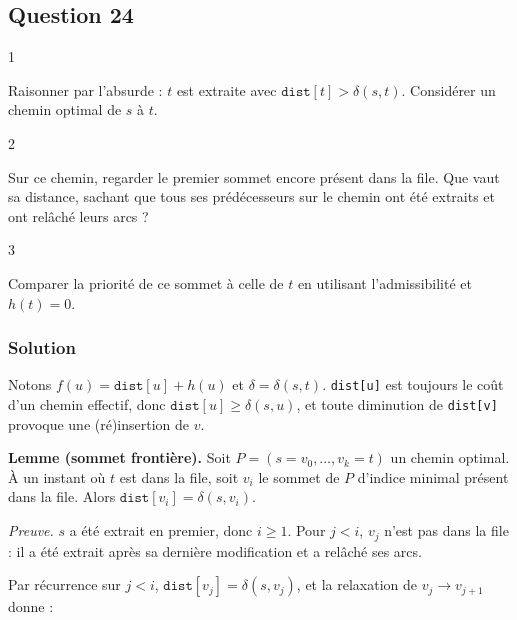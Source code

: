 \documentclass[11pt,a4paper]{article}
\begin{document}
\hypertarget{question-24}{%
\subsection{Question 24}\label{question-24}}

\begin{indication}{1}

Raisonner par l'absurde : \(t\) est extraite avec \(\texttt{dist}[t] > \delta(s,t)\). Considérer un chemin optimal de \(s\) à \(t\).

\end{indication}

\begin{indication}{2}

Sur ce chemin, regarder le premier sommet encore présent dans la file. Que vaut sa distance, sachant que tous ses prédécesseurs sur le chemin ont été extraits et ont relâché leurs arcs ?

\end{indication}

\begin{indication}{3}

Comparer la priorité de ce sommet à celle de \(t\) en utilisant l'admissibilité et \(h(t) = 0\).

\end{indication}

\hypertarget{solution-23}{%
\subsubsection{Solution}\label{solution-23}}

Notons \(f(u) = \texttt{dist}[u] + h(u)\) et \(\delta = \delta(s,t)\). \texttt{dist{[}u{]}} est toujours le coût d'un chemin effectif, donc \(\texttt{dist}[u] \ge \delta(s,u)\), et toute diminution de \texttt{dist{[}v{]}} provoque une (ré)insertion de \(v\).

\textbf{Lemme (sommet frontière).} Soit \(P = (s = v_0, \dots, v_k = t)\) un chemin optimal. À un instant où \(t\) est dans la file, soit \(v_i\) le sommet de \(P\) d'indice minimal présent dans la file. Alors \(\texttt{dist}[v_i] = \delta(s,v_i)\).

\emph{Preuve.} \(s\) a été extrait en premier, donc \(i \ge 1\). Pour \(j < i\), \(v_j\) n'est pas dans la file : il a été extrait après sa dernière modification et a relâché ses arcs.

Par récurrence sur \(j < i\), \(\texttt{dist}[v_j] = \delta(s,v_j)\), et la relaxation de \(v_j \to v_{j+1}\) donne :
\end{document}
